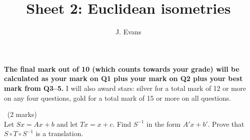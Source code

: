 \documentclass[12pt]{article}
\title{Sheet 2: Euclidean isometries}
\author{J. Evans}
\date{}
\begin{document}
\maketitle

\bigskip

{\bf The final mark out of 10 (which counts towards your grade) will be calculated as your mark on Q1 plus your mark on Q2 plus your best mark from Q3--5.} I will also award stars: silver for a total mark of 12 or more on any four questions, gold for a total mark of 15 or more on all questions.

\vspace{1cm}

\begin{question}\ (2 marks)\\
Let $Sx=Ax+b$ and let $Tx=x+c$. Find $S^{-1}$ in the form $A'x+b'$. Prove that $S\circ T\circ S^{-1}$ is a translation.
\end{question}

\iffalse
\begin{answer}
  We have $S^{-1}(S(x))=A'(Ax+b)+b'=A'Ax+A'b+b'=x$ so $A'=A^{-1}$ and $A'b=-b'$, i.e. $b'=-A^{-1}b$. Now
  \begin{align*}
    S(T(S^{-1}(x)))&=S(T(A^{-1}x-A^{-1}b))\\
    &=S(A^{-1}x-A^{-1}b+c)\\
    &=A(A^{-1}x-A^{-1}b+c)+b\\
    &=x+Ac
  \end{align*}
\end{answer}
\newpage
\fi

\vspace{1cm}
\end{document}
